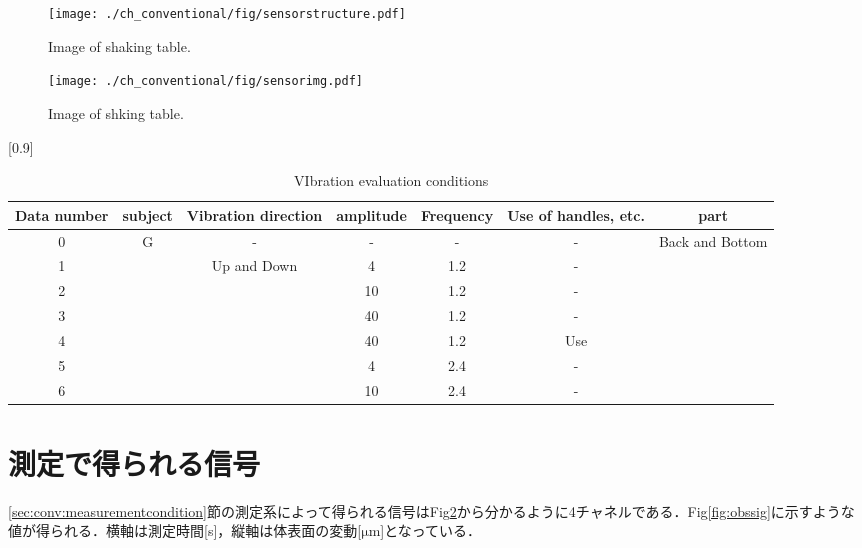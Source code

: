 \begin{figure}[tb]
\centering
\texttt{[image: ./ch\_conventional/fig/sensorstructure.pdf]}
\caption{Image of shaking table.}
\label{fig:sensorstructure}
\end{figure}

\begin{figure}[tb]
\centering
\texttt{[image: ./ch\_conventional/fig/sensorimg.pdf]}
\caption{Image of shking table.}
\label{fig:sensorimg}
\end{figure}

\begin{table}[b]
  \caption{VIbration evaluation conditions}
  \centering
  \scalebox{0.8}[0.9]{
  \begin{tabular}{|c|c|c|c|c|c|c|} \hline
    Data number & subject & Vibration direction & amplitude & Frequency &  Use of handles, etc. & part \\ \hline \hline
    0 & \multirow{7}{*}{G} & - & - & - & - & \multirow{7}{*}{Back and Bottom}   \\ \cline{1-1} \cline{3-3} \cline{4-4} \cline{5-5} \cline{6-6}
    1 & & \multirow{6}{*}{Up and Down} & 4 & 1.2 & - &  \\ \cline{1-1} \cline{4-4} \cline{5-5} \cline{6-6}
    2 & &  & 10 & 1.2 & - &   \\ \cline{1-1} \cline{4-4} \cline{5-5} \cline{6-6}
    3 & &  & 40 & 1.2 & - &   \\ \cline{1-1} \cline{4-4} \cline{5-5} \cline{6-6}
    4 & &  & 40 & 1.2 & Use &   \\ \cline{1-1} \cline{4-4} \cline{5-5} \cline{6-6}
    5 & &  & 4 & 2.4 & - &   \\ \cline{1-1} \cline{4-4} \cline{5-5} \cline{6-6}
    6 & &  & 10 & 2.4 & - &   \\ \hline
  \end{tabular}
  }
  \label{tab:vibevacondition}
\end{table}

\section{測定で得られる信号}
\label{sec:conv:signal}
\ref{sec:conv:measurementcondition}節の測定系によって得られる信号はFig\ref{fig:sensorimg}から分かるように4チャネルである．Fig\ref{fig:obssig}に示すような値が得られる．横軸は測定時間[s]，縦軸は体表面の変動[$\mathrm{\mu}$m]となっている．


